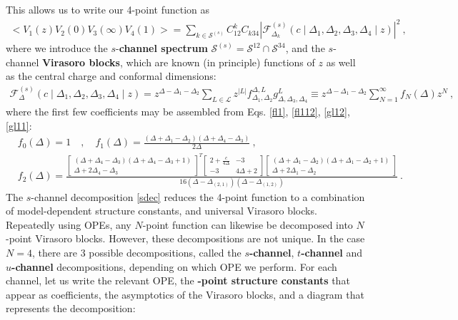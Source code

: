 \documentclass[12pt, a4paper]{article}
\newcommand{\myindex}[1]{\textbf{\boldmath #1}}
\theoremstyle{break}
\begin{document}
This allows us to write our 4-point function as 
\begin{align}
 \boxed{\Big<V_1(z)V_2(0)V_3(\infty)V_4(1)\Big> = \sum_{k\in\mathcal{S}^{(s)}} C_{12}^k C_{k34} \left|\mathcal{F}^{(s)}_{\Delta_k}\left(c\middle|\Delta_1,\Delta_2,\Delta_3,\Delta_4\middle|z\right)\right|^2}  \ ,
 \label{sdec}
\end{align}
where we introduce the $s$-\myindex{channel spectrum} $\mathcal{S}^{(s)}= \mathcal{S}^{12}\cap \mathcal{S}^{34}$, and the $s$-channel \myindex{Virasoro blocks}, which are known (in principle) functions of $z$ as well as the central charge and conformal dimensions:
\begin{align}
 \mathcal{F}_{\Delta}^{(s)}\left(c\middle|\Delta_1,\Delta_2,\Delta_3,\Delta_4\middle|z\right) = z^{\Delta-\Delta_1-\Delta_2}\sum_{L\in\mathcal{L}} z^{|L|} f_{\Delta_1,\Delta_2}^{\Delta,L}g^L_{\Delta,\Delta_3,\Delta_4}\equiv z^{\Delta-\Delta_1-\Delta_2}\sum_{N=1}^\infty f_N(\Delta)z^N \ ,
 \label{fsl}
\end{align}
where the first few coefficients may be assembled from Eqs. \eqref{fl1}, \eqref{fl112}, \eqref{gl12}, \eqref{gl11}:
\begin{align}
& f_0(\Delta) = 1 \quad , \quad f_1(\Delta) = \frac{(\Delta+\Delta_1-\Delta_2)(\Delta+\Delta_4-\Delta_3)}{2\Delta} \ ,
\\
& f_2(\Delta) =  \frac{\left[\begin{smallmatrix} (\Delta+\Delta_4-\Delta_3)(\Delta+\Delta_4-\Delta_3+1) \\ \Delta+2\Delta_4-\Delta_3 \end{smallmatrix}\right]^T
\left[\begin{smallmatrix} 2+\frac{c}{4\Delta} & -3 \\ -3 & 4\Delta+2 \end{smallmatrix}\right]
\left[\begin{smallmatrix} (\Delta+\Delta_1-\Delta_2)(\Delta+\Delta_1-\Delta_2+1) \\ \Delta+2\Delta_1-\Delta_2 \end{smallmatrix}\right]}{16(\Delta-\Delta_{(2,1)})(\Delta-\Delta_{(1,2)})}
 \ .
 \label{f2d}
\end{align}
The $s$-channel decomposition \eqref{sdec} reduces the 4-point function to a combination of model-dependent structure constants, and universal Virasoro blocks. Repeatedly using OPEs, any $N$-point function can likewise be decomposed into $N$-point Virasoro blocks. However, these decompositions are not unique. In the case $N=4$, there are 3 possible decompositions, called the \myindex{$s$-channel}, \myindex{$t$-channel} and \myindex{$u$-channel} decompositions, depending on which OPE we perform. For each channel, let us write the relevant OPE, the \myindex{4-point structure constants} that appear as coefficients, the asymptotics of the Virasoro blocks, and a diagram that represents the decomposition:
\end{document}
